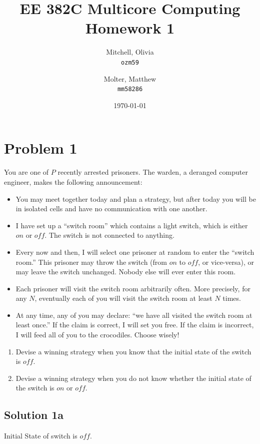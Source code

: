 \documentclass{article}
\title{EE 382C Multicore Computing Homework 1}
\author{
    Mitchell, Olivia\\
    \texttt{ozm59}
    \and
    Molter, Matthew\\
    \texttt{mm58286}}
\date{\today}
\begin{document}
\maketitle

\section{Problem 1}
 You are one of $P$ recently arrested prisoners. The warden, a deranged computer engineer, makes the following announcement:
\begin{itemize}
  \item You may meet together today and plan a strategy, but after today you will be in isolated cells and have no communication with one another.
  \item I have set up a “switch room” which contains a light switch, which is either $on$ or $off$. The switch is not connected to anything.
  \item Every now and then, I will select one prisoner at random to enter the “switch room.” This prisoner may throw the switch (from $on$ to $off$, or vice-versa), or may leave the switch unchanged. Nobody else will ever enter this room.
  \item Each prisoner will visit the switch room arbitrarily often. More precisely, for any $N$, eventually each of you will visit the switch room at least $N$ times.
  \item At any time, any of you may declare: “we have all visited the switch room at least once.” If the claim is correct, I will set you free. If the claim is incorrect, I will feed all of you to the crocodiles. Choose wisely!
\end{itemize}

\begin{enumerate}[label=\alph*)]
  \item Devise a winning strategy when you know that the initial state of the switch is $off$.
  \item Devise a winning strategy when you do not know whether the initial state of the switch is $on$ or $off$.
\end{enumerate}

\subsection{Solution 1a}

Initial State of switch is $off$.
\end{document}
